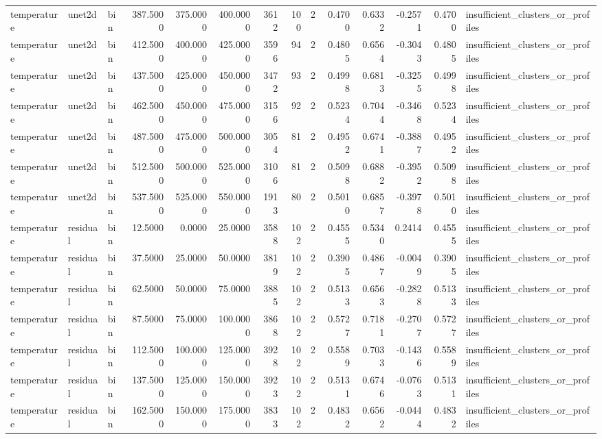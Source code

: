 \begin{tabular}{lllrrrrrrrrrrl}
temperature & unet2d & bin & 387.5000 & 375.0000 & 400.0000 & 3612 & 100 & 2 & 0.4700 & 0.6332 & -0.2571 & 0.4700 & insufficient_clusters_or_profiles \\
temperature & unet2d & bin & 412.5000 & 400.0000 & 425.0000 & 3596 & 94 & 2 & 0.4805 & 0.6564 & -0.3043 & 0.4805 & insufficient_clusters_or_profiles \\
temperature & unet2d & bin & 437.5000 & 425.0000 & 450.0000 & 3472 & 93 & 2 & 0.4998 & 0.6813 & -0.3255 & 0.4998 & insufficient_clusters_or_profiles \\
temperature & unet2d & bin & 462.5000 & 450.0000 & 475.0000 & 3156 & 92 & 2 & 0.5234 & 0.7044 & -0.3468 & 0.5234 & insufficient_clusters_or_profiles \\
temperature & unet2d & bin & 487.5000 & 475.0000 & 500.0000 & 3054 & 81 & 2 & 0.4952 & 0.6741 & -0.3887 & 0.4952 & insufficient_clusters_or_profiles \\
temperature & unet2d & bin & 512.5000 & 500.0000 & 525.0000 & 3106 & 81 & 2 & 0.5098 & 0.6882 & -0.3952 & 0.5098 & insufficient_clusters_or_profiles \\
temperature & unet2d & bin & 537.5000 & 525.0000 & 550.0000 & 1913 & 80 & 2 & 0.5010 & 0.6857 & -0.3978 & 0.5010 & insufficient_clusters_or_profiles \\
temperature & residual & bin & 12.5000 & 0.0000 & 25.0000 & 3588 & 102 & 2 & 0.4555 & 0.5340 & 0.2414 & 0.4555 & insufficient_clusters_or_profiles \\
temperature & residual & bin & 37.5000 & 25.0000 & 50.0000 & 3819 & 102 & 2 & 0.3905 & 0.4867 & -0.0049 & 0.3905 & insufficient_clusters_or_profiles \\
temperature & residual & bin & 62.5000 & 50.0000 & 75.0000 & 3885 & 102 & 2 & 0.5133 & 0.6563 & -0.2828 & 0.5133 & insufficient_clusters_or_profiles \\
temperature & residual & bin & 87.5000 & 75.0000 & 100.0000 & 3868 & 102 & 2 & 0.5727 & 0.7181 & -0.2707 & 0.5727 & insufficient_clusters_or_profiles \\
temperature & residual & bin & 112.5000 & 100.0000 & 125.0000 & 3928 & 102 & 2 & 0.5589 & 0.7033 & -0.1436 & 0.5589 & insufficient_clusters_or_profiles \\
temperature & residual & bin & 137.5000 & 125.0000 & 150.0000 & 3923 & 102 & 2 & 0.5131 & 0.6746 & -0.0763 & 0.5131 & insufficient_clusters_or_profiles \\
temperature & residual & bin & 162.5000 & 150.0000 & 175.0000 & 3833 & 102 & 2 & 0.4832 & 0.6562 & -0.0444 & 0.4832 & insufficient_clusters_or_profiles \\

\end{tabular}
